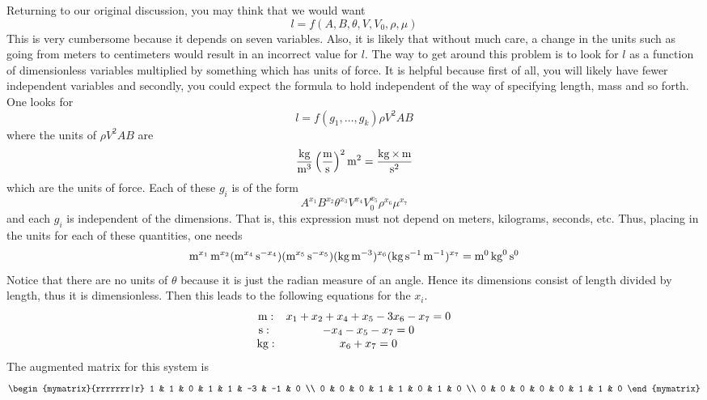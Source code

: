 Returning to our original discussion, you may think that we would want
\begin{equation*}
l=f(A,B,\theta,V,V_0,\rho,\mu)
\end{equation*}
This is very cumbersome because it depends on seven variables. Also,
it is likely that without much care, a change in the units such as
going from meters to centimeters would result in an incorrect value
for $l$. The way to get around this problem is to look for $l $ as a
function of dimensionless variables multiplied by something which has
units of force. It is helpful because first of all, you will likely
have fewer independent variables and secondly, you could expect the
formula to hold independent of the way of specifying length, mass and
so forth. One looks for
\begin{equation*}
l=f(g_1,\ldots,g_k) \rho V^2AB
\end{equation*}
where the units of $\rho V^2AB$ are
\begin{equation*}
\frac{\kg}{\m^3}\paren{\frac{\m}{\s }}^2\m^2=\frac{\kg\times \m}{%
\s^2}
\end{equation*}
which are the units of force. Each of these $g_i$ is of the form
\begin{equation}
A^{x_1}B^{x_2}\theta^{x_3}V^{x_4}V_0^{x_5}\rho^{x_6}\mu
^{x_7}  \label{11-july-e1f}
\end{equation}
and each $g_i$ is independent of the dimensions. That is, this expression
must not depend on meters, kilograms, seconds, etc. Thus, placing in the
units for each of these quantities, one needs
\begin{equation*}
\mathop{\textrm{\rm m}}\nolimits^{x_1}\mathop{\textrm{\rm m}}\nolimits^{x_2}(\mathop{\textrm{\rm m}}\nolimits^{x_4}\mathop{\textrm{\rm s}}\nolimits^{-x_4}) (\mathop{\textrm{\rm m}}\nolimits^{x_5}\mathop{\textrm{\rm s}}\nolimits
^{-x_5}) (\mathop{\textrm{\rm kg}}\nolimits\mathop{\textrm{\rm m}}\nolimits^{-3})^{x_6}(\mathop{\textrm{\rm kg}}\nolimits\mathop{\textrm{\rm s}}\nolimits
^{-1}\mathop{\textrm{\rm m}}\nolimits^{-1})^{x_7}=\mathop{\textrm{\rm m}}\nolimits^0\mathop{\textrm{\rm kg}}\nolimits^0\mathop{\textrm{\rm s}}\nolimits^0
\end{equation*}
Notice that there are no units of $\theta$ because it is just the radian
measure of an angle. Hence its dimensions consist of length divided by
length, thus it is dimensionless. Then this leads to the following equations
for the $x_i$.
\begin{equation*}
\begin{array}{cc}
\m: & x_1+x_2+x_4+x_5-3x_6-x_7=0 \\
\s :\  & -x_4-x_5-x_7=0 \\
\kg: & x_6+x_7=0%
\end{array}
\end{equation*}
The augmented matrix for this system is
\begin{equation*}
\begin{mymatrix}{rrrrrrr|r}
1 & 1 & 0 & 1 & 1 & -3 & -1 & 0 \\
0 & 0 & 0 & 1 & 1 & 0 & 1 & 0 \\
0 & 0 & 0 & 0 & 0 & 1 & 1 & 0
\end{mymatrix}
\end{equation*}
